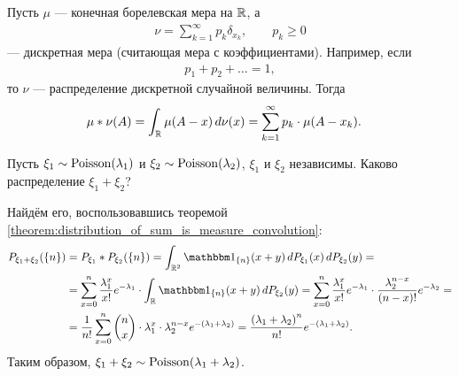 \documentclass[../main.tex]{subfiles}
\begin{document}
\begin{exmpl}
 Пусть $ \mu $ --- конечная борелевская  мера на $ \mathbb{R}$, а
 \begin{align*}
  \nu = \sum_{k=1}^{\infty} p_k \delta_{x_k}, \qquad p_k \geqslant 0
 \end{align*} --- дискретная мера (считающая мера с коэффициентами). Например, если
 \begin{align*}
  p_1 + p_2 + \ldots = 1,
 \end{align*} то $ \nu $ --- распределение дискретной случайной величины. Тогда
 \begin{align*}
  \mu \ast \nu(A) &= \int_{\mathbb{R}} \mu(A - x) \,d\nu(x) = \sum_{k=1}^{\infty}p_k\cdot \mu(A - x_k).
 \end{align*} 
\end{exmpl}
\begin{exmpl}
 Пусть $ \xi_1 \sim \mathrm{Poisson}(\lambda_1) $ и $ \xi_2 \sim \mathrm{Poisson}(\lambda_2) $, $ \xi_1 $  и $ \xi_2 $ независимы. Каково распределение $ \xi_1 + \xi_2 $?

 Найдём его, воспользовавшись теоремой \ref{theorem:distribution_of_sum_is_measure_convolution}:
 \begin{align*}
  P_{\xi_1 + \xi_2}(\left\{ n \right\}) &= P_{\xi_1} \ast P_{\xi_2}(\left\{ n \right\}) = \int_{\R^{2}}  \Ind_{\left\{ n \right\}}(x+y)\,dP_{\xi_1}(x)\,dP_{\xi_2}(y) = \\
  &= \sum_{x=0}^{n} \frac{\lambda_1^{x}}{x!} e^{-\lambda_1} \cdot \int_{\R} \Ind_{\left\{ n \right\}}(x+y) \, dP_{\xi_2}(y) = \sum_{x=0}^{n} \frac{\lambda_1^{x}}{x!}e^{-\lambda_1} \cdot \frac{\lambda_2^{n-x}}{(n-x)!}e^{-\lambda_2} = \\
  &= \frac{1}{n!} \sum_{x=0}^{n}\binom n x \cdot \lambda_1^{x} \cdot \lambda_2^{n-x} e^{-(\lambda_1 + \lambda_2)}= \frac{\left( \lambda_1 + \lambda_2 \right)^{n}}{n!}e^{-(\lambda_1 + \lambda_2)}.
 \end{align*} Таким образом, $ \xi_1 + \xi_2 \sim \mathrm{Poisson}(\lambda_1 + \lambda_2) $.
\end{exmpl}
\end{document}
